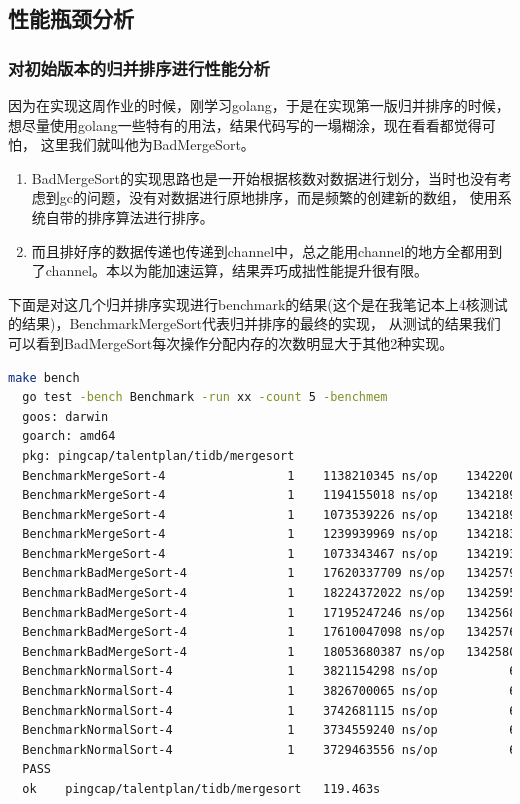 \documentclass[UTF8]{ctexart}
\begin{document}
\subsection{性能瓶颈分析}
\subsubsection{对初始版本的归并排序进行性能分析}
因为在实现这周作业的时候，刚学习golang，于是在实现第一版归并排序的时候，想尽量使用golang一些特有的用法，结果代码写的一塌糊涂，现在看看都觉得可怕，
这里我们就叫他为BadMergeSort。
\begin{enumerate}
  \item BadMergeSort的实现思路也是一开始根据核数对数据进行划分，当时也没有考虑到gc的问题，没有对数据进行原地排序，而是频繁的创建新的数组，
  使用系统自带的排序算法进行排序。
  \item 而且排好序的数据传递也传递到channel中，总之能用channel的地方全都用到了channel。本以为能加速运算，结果弄巧成拙性能提升很有限。
\end{enumerate}
下面是对这几个归并排序实现进行benchmark的结果(这个是在我笔记本上4核测试的结果)，BenchmarkMergeSort代表归并排序的最终的实现，
从测试的结果我们可以看到BadMergeSort每次操作分配内存的次数明显大于其他2种实现。
\begin{lstlisting}[language=bash]
  make bench
  go test -bench Benchmark -run xx -count 5 -benchmem
  goos: darwin
  goarch: amd64
  pkg: pingcap/talentplan/tidb/mergesort
  BenchmarkMergeSort-4      	       1	1138210345 ns/op	134220016 B/op	      11 allocs/op
  BenchmarkMergeSort-4      	       1	1194155018 ns/op	134218992 B/op	       8 allocs/op
  BenchmarkMergeSort-4      	       1	1073539226 ns/op	134218992 B/op	       8 allocs/op
  BenchmarkMergeSort-4      	       1	1239939969 ns/op	134218320 B/op	       7 allocs/op
  BenchmarkMergeSort-4      	       1	1073343467 ns/op	134219376 B/op	       9 allocs/op
  BenchmarkBadMergeSort-4   	       1	17620337709 ns/op	134257976 B/op	      33 allocs/op
  BenchmarkBadMergeSort-4   	       1	18224372022 ns/op	134259544 B/op	      36 allocs/op
  BenchmarkBadMergeSort-4   	       1	17195247246 ns/op	134256824 B/op	      27 allocs/op
  BenchmarkBadMergeSort-4   	       1	17610047098 ns/op	134257688 B/op	      33 allocs/op
  BenchmarkBadMergeSort-4   	       1	18053680387 ns/op	134258072 B/op	      34 allocs/op
  BenchmarkNormalSort-4     	       1	3821154298 ns/op	      64 B/op	       2 allocs/op
  BenchmarkNormalSort-4     	       1	3826700065 ns/op	      64 B/op	       2 allocs/op
  BenchmarkNormalSort-4     	       1	3742681115 ns/op	      64 B/op	       2 allocs/op
  BenchmarkNormalSort-4     	       1	3734559240 ns/op	      64 B/op	       2 allocs/op
  BenchmarkNormalSort-4     	       1	3729463556 ns/op	      64 B/op	       2 allocs/op
  PASS
  ok  	pingcap/talentplan/tidb/mergesort	119.463s
\end{lstlisting}
\end{document}
